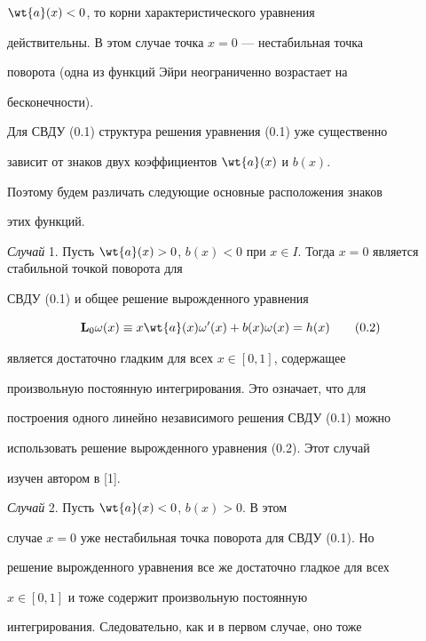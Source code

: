 $\wt{a} (x) < 0$, то корни характеристического уравнения


действительны. В этом случае точка $x = 0$ --- нестабильная точка


поворота (одна из функций Эйри неограниченно возрастает на


бесконечности).





Для СВДУ (0.1) структура решения уравнения (0.1) уже существенно


зависит от знаков двух коэффициентов $\wt{a}(x)$ и $b (x)$.


Поэтому будем различать следующие основные расположения знаков


этих функций.





{\it Случай} 1. Пусть $\wt{a}(x) > 0$, $b (x) < 0$ при $x


\in I$. Тогда $x = 0$ является стабильной точкой поворота для


СВДУ (0.1) и общее решение вырожденного уравнения


\begin{equation}


\bold{L}_0 \omega (x) \equiv x \wt{a} (x) \omega' (x) + b(x) \omega (x)


= h (x)\tag{0.2}


\end{equation}


является достаточно гладким для всех $x \in [0,1]$, содержащее


произвольную постоянную интегрирования. Это означает, что для


построения одного линейно независимого решения СВДУ (0.1) можно


использовать решение вырожденного уравнения (0.2). Этот случай


изучен автором в [1].





{\it Случай} 2. Пусть $\wt{a}(x) < 0$, $b (x) > 0$. В этом


случае $x = 0$ уже нестабильная точка поворота для СВДУ (0.1). Но


решение вырожденного уравнения все же достаточно гладкое для всех


$x \in [0,1]$ и тоже содержит произвольную постоянную


интегрирования. Следовательно, как и в первом случае, оно тоже


